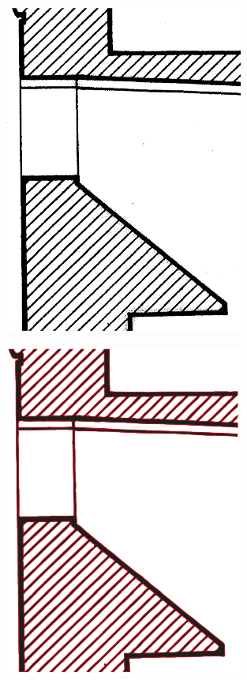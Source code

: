 \begin{figure}[h!tbp]
\centering
\begin{subfigure}{.3\textwidth}
  \centering
  \includegraphics[width=.8\linewidth]{bilder/vektor_vektorisierungStrichzeichnungA.pdf}
  \caption{}
\end{subfigure}%
\begin{subfigure}{.3\textwidth}
  \centering
  \includegraphics[width=.8\linewidth]{bilder/vektor_vektorisierungStrichzeichnungB.pdf}

\end{subfigure}
\end{figure}
